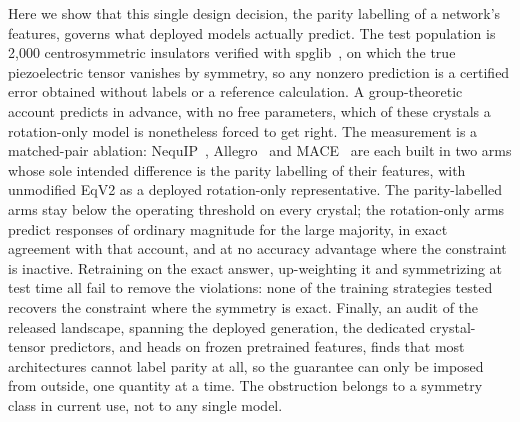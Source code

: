 Here we show that this single design decision, the parity labelling of a network's features, governs what deployed models actually predict. The test population is 2,000 centrosymmetric insulators verified with spglib~\cite{togo2024spglib}, on which the true piezoelectric tensor vanishes by symmetry, so any nonzero prediction is a certified error obtained without labels or a reference calculation. A group-theoretic account predicts in advance, with no free parameters, which of these crystals a rotation-only model is nonetheless forced to get right. The measurement is a matched-pair ablation: NequIP~\cite{batzner2022nequip}, Allegro~\cite{musaelian2023allegro} and MACE~\cite{batatia2022mace} are each built in two arms whose sole intended difference is the parity labelling of their features, with unmodified EqV2 as a deployed rotation-only representative. The parity-labelled arms stay below the operating threshold on every crystal; the rotation-only arms predict responses of ordinary magnitude for the large majority, in exact agreement with that account, and at no accuracy advantage where the constraint is inactive. Retraining on the exact answer, up-weighting it and symmetrizing at test time all fail to remove the violations: none of the training strategies tested recovers the constraint where the symmetry is exact. Finally, an audit of the released landscape, spanning the deployed generation, the dedicated crystal-tensor predictors, and heads on frozen pretrained features, finds that most architectures cannot label parity at all, so the guarantee can only be imposed from outside, one quantity at a time. The obstruction belongs to a symmetry class in current use, not to any single model.
